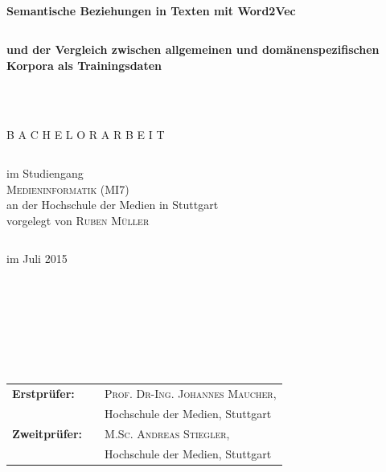 \documentclass[12pt,a4paper]{report}
\begin{document}
\thispagestyle{empty}
\begin{verbatim}





\end{verbatim}
\begin{center}
\textbf{\huge{Semantische Beziehungen in Texten mit Word2Vec }}\\
\begin{verbatim}
\end{verbatim}
\textbf{\large{und der Vergleich zwischen allgemeinen und domänenspezifischen Korpora als Trainingsdaten}}
\end{center}
\begin{verbatim}



\end{verbatim}
\begin{center}
\large B A C H E L O R A R B E I T

\begin{verbatim}
\end{verbatim}

\end{center}
\begin{center}
im Studiengang\\
\textsc{Medieninformatik (MI7)}\\
an der Hochschule der Medien in Stuttgart\\
vorgelegt von \textsc{Ruben Müller}\\
\begin{verbatim}
\end{verbatim}
im Juli 2015


\end{center}
\begin{verbatim}







\end{verbatim}

\begin{flushleft}
\begin{tabular}{lll}
\textbf{Erstprüfer:} & & \textsc{Prof. Dr-Ing. Johannes Maucher},\\ 
&&\small Hochschule der Medien, Stuttgart  \\
\textbf{Zweitprüfer:} & & \textsc{M.Sc. Andreas Stiegler},\\
&&\small Hochschule der Medien, Stuttgart\\
\end{tabular}
\end{flushleft}
\end{document}
